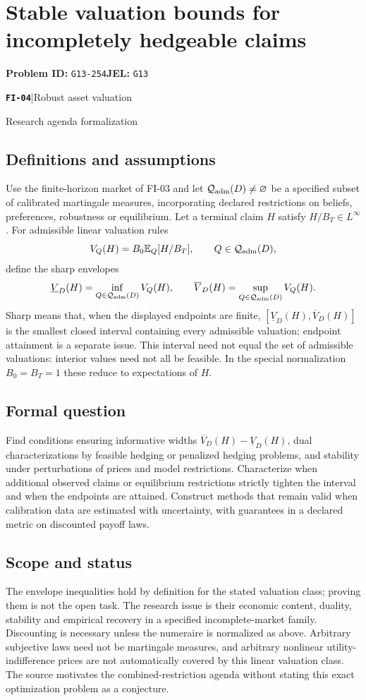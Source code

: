 \documentclass[11pt,a4paper]{article}
\newcommand{\E}{\mathbb E}
\newcommand{\entrymeta}[3]{{\sffamily\small\color{muted}\textbf{\texttt{#1}}\quad|\quad #2\par #3\par}}
\begin{document}
\section*{Stable valuation bounds for incompletely hedgeable claims}
\textbf{Problem ID:} \texttt{G13-254}\quad \textbf{JEL:} \texttt{G13}\par
\label{problem:OP-0581}
\label{beyond:FI-04}
\entrymeta{FI-04}{Robust asset valuation}{Research agenda formalization}
\subsection*{Definitions and assumptions}
Use the finite-horizon market of FI-03 and let $\mathcal Q_{\rm adm}(D)\ne\varnothing$ be a specified subset of calibrated martingale measures, incorporating declared restrictions on beliefs, preferences, robustness or equilibrium. Let a terminal claim $H$ satisfy $H/B_T\in L^\infty$. For admissible linear valuation rules
\[
 V_Q(H)=B_0\E_Q[H/B_T],\qquad Q\in\mathcal Q_{\rm adm}(D),
\]
define the sharp envelopes
\[
 \underline V_D(H)=\inf_{Q\in\mathcal Q_{\rm adm}(D)}V_Q(H),\qquad
 \overline V_D(H)=\sup_{Q\in\mathcal Q_{\rm adm}(D)}V_Q(H).
\]
Sharp means that, when the displayed endpoints are finite, $[\underline V_D(H),\overline V_D(H)]$ is the smallest closed interval containing every admissible valuation; endpoint attainment is a separate issue. This interval need not equal the set of admissible valuations: interior values need not all be feasible. In the special normalization $B_0=B_T=1$ these reduce to expectations of $H$.
\subsection*{Formal question}
Find conditions ensuring informative widths $\overline V_D(H)-\underline V_D(H)$, dual characterizations by feasible hedging or penalized hedging problems, and stability under perturbations of prices and model restrictions. Characterize when additional observed claims or equilibrium restrictions strictly tighten the interval and when the endpoints are attained. Construct methods that remain valid when calibration data are estimated with uncertainty, with guarantees in a declared metric on discounted payoff laws.
\subsection*{Scope and status}
The envelope inequalities hold by definition for the stated valuation class; proving them is not the open task. The research issue is their economic content, duality, stability and empirical recovery in a specified incomplete-market family. Discounting is necessary unless the numeraire is normalized as above. Arbitrary subjective laws need not be martingale measures, and arbitrary nonlinear utility-indifference prices are not automatically covered by this linear valuation class. The source motivates the combined-restriction agenda without stating this exact optimization problem as a conjecture.
\end{document}
